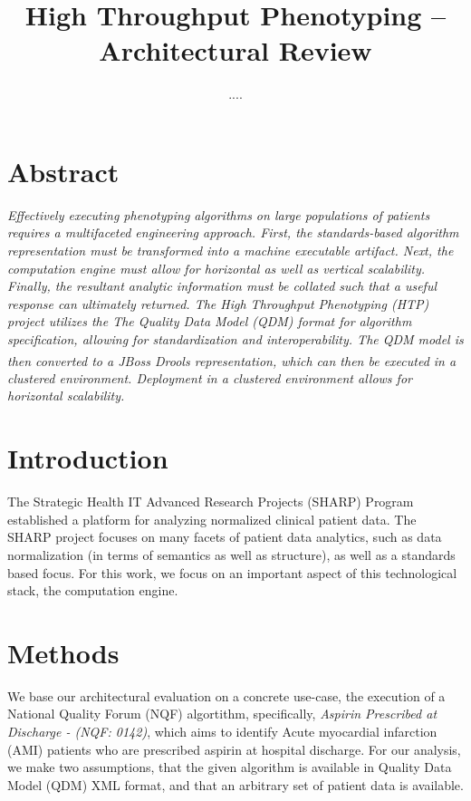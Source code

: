 \documentclass{amia}
\begin{document}
\title{High Throughput Phenotyping -- Architectural Review}

\author{ 
     ....
}


\maketitle

\section*{Abstract}

\textit{Effectively executing phenotyping algorithms on large populations of patients requires a multifaceted engineering approach. First, the standards-based algorithm representation must be transformed into a machine executable artifact. Next, the computation engine must allow for horizontal as well as vertical scalability. Finally, the resultant analytic information must be collated such that a useful response can ultimately returned. The High Throughput Phenotyping (HTP) project utilizes the The Quality Data Model (QDM) format for algorithm specification, allowing for standardization and interoperability. The QDM model is then converted to a JBoss{\textsuperscript{\textregistered}} Drools representation, which can then be executed in a clustered environment. Deployment in a clustered environment allows for horizontal scalability.}

\section*{Introduction}
The Strategic Health IT Advanced Research Projects (SHARP) Program established a platform for analyzing normalized clinical patient data\cite{pathak2013normalization,rea2012building}. The SHARP project focuses on many facets of patient data analytics, such as data normalization (in terms of semantics as well as structure), as well as a standards based focus. For this work, we focus on an important aspect of this technological stack, the computation engine. 

\section*{Methods}
We base our architectural evaluation on a concrete use-case, the execution of a National Quality Forum (NQF) algortithm, specifically, \textit{Aspirin Prescribed at Discharge - (NQF: 0142)}, which aims to identify Acute myocardial infarction (AMI) patients who are prescribed aspirin at hospital discharge. For our analysis, we make two assumptions, that the given algorithm is available in Quality Data Model (QDM) XML format, and that an arbitrary set of patient data is available.
\end{document}
